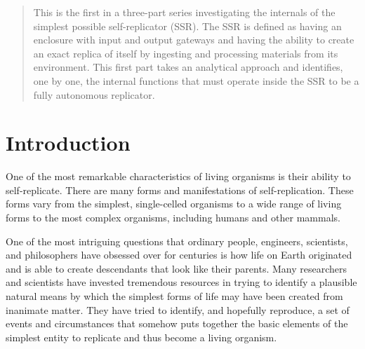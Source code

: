
\newcommand\migneafigurewide[3]{
	\begin{figure}
		\centering
		\texttt{[image: \#1]}
		\caption{{#2}}
		\label{#3}
	\end{figure}
}
\newcommand\migneafigure[3]{
	\begin{figure}
		\centering
		\texttt{[image: \#1]}
		\caption{{#2}}
		\label{#3}
	\end{figure}
}
\newcommand\mterm[1]{\emph{#1}}
\newcommand\memph[1]{\emph{#1}}


\begin{abstract}
This is the first in a three-part series investigating the internals 
of the simplest possible self-replicator (SSR). 
The SSR is defined as having an enclosure with input
and output gateways and having the ability to create an exact replica
of itself by ingesting and processing materials from its
environment. This first part takes an analytical approach and identifies, one
by one, the internal functions that must operate inside
the SSR to be a fully autonomous replicator.
\end{abstract}

\section{Introduction}

One of the most remarkable characteristics of living organisms is
their ability to self-replicate. There are many forms and
manifestations of self-replication. These forms vary
from the simplest, single-celled organisms to a wide range of
living forms to the most complex organisms, including humans and
other mammals.

One of the most intriguing questions that ordinary people, engineers,
scientists, and philosophers have obsessed over for centuries is how life on Earth
originated and is able
to create
descendants that look like their parents.
Many researchers and scientists
have invested tremendous resources in trying to identify a plausible
natural means by which the simplest forms of life may have been created
from inanimate matter. They have tried to identify, and hopefully
reproduce, a set of events and circumstances that somehow puts
together the basic elements of the simplest entity 
to replicate and thus become a living organism.

